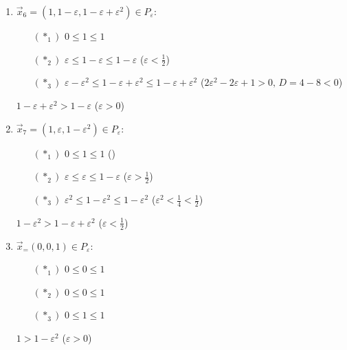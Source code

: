 \documentclass[a4paper]{article}
\def\eps{\varepsilon}
\begin{document}
\begin{enumerate}
\item $\vec{x}_6=(1,1-\eps,1-\eps+\eps^2)\in P_\eps$:\begin{enumerate}
\item[$(*_1)$] $0\leqslant 1 \leqslant 1$
\item[$(*_2)$] $\eps \leqslant 1-\eps \leqslant 1-\eps$ ($\eps<\frac{1}{2} $)
\item[$(*_3)$] $\eps-\eps^2 \leqslant 1-\eps+\eps^2 \leqslant 1-\eps+\eps^2$ ($2\eps^2-2\eps+1>0,\,D=4-8<0$)
\end{enumerate}
$1-\eps+\eps^2>1-\eps$ ($\eps>0$)

\item $\vec{x}_7=(1,\eps,1-\eps^2)\in P_\eps$:\begin{enumerate}
\item[$(*_1)$] $0\leqslant 1 \leqslant 1$ ($ $)
\item[$(*_2)$] $\eps \leqslant \eps \leqslant 1-\eps$ ($\eps>\frac{1}{2} $)
\item[$(*_3)$] $\eps^2 \leqslant 1-\eps^2 \leqslant 1-\eps^2$ ($\eps^2<\frac{1}{4}<\frac{1}{2} $)
\end{enumerate}
$1-\eps^2>1-\eps+\eps^2$ ($\eps<\frac{1}{2}$)

\item $\vec{x}_=(0,0,1)\in P_\eps$:\begin{enumerate}
\item[$(*_1)$] $0\leqslant 0 \leqslant 1$
\item[$(*_2)$] $0\leqslant 0 \leqslant 1$
\item[$(*_3)$] $0\leqslant 1 \leqslant 1$
\end{enumerate}
$1>1-\eps^2$ ($\eps>0$)

\end{enumerate}
\end{document}
